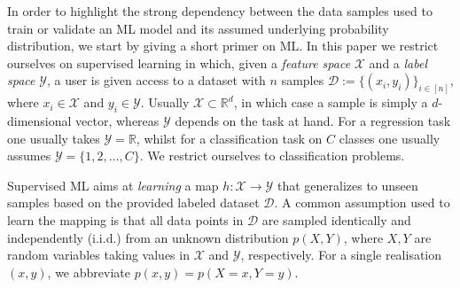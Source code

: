 \documentclass[11pt]{article}
\def \cD {\mathcal D}
\def \cX {\mathcal X}
\def \cY {\mathcal Y}
\newcommand{\RR}{\mathbb{R}}
\begin{document}
In order to highlight the strong dependency between the data samples used to train or validate an ML model and its assumed underlying probability distribution, we start by giving a short primer on ML. In this paper we restrict ourselves on supervised learning in which, given a \textit{feature space} $\cX$ and a \textit{label space} $\cY$, a user is given access to a dataset with $n$ samples  $\cD := \{(x_i, y_i)\}_{i \in [n]}$, where $x_i \in \cX$ and $y_i \in \cY$. Usually $\cX \subset \RR^d$, in which case a sample is simply a $d$-dimensional vector, whereas $\cY$ depends on the task at hand. For a regression task one usually takes $\cY = \RR$, whilst for a classification task on $C$ classes one usually assumes $\cY = \{1,2,\ldots,C\}$. We restrict ourselves to classification problems.

Supervised ML aims at \textit{learning} a map $h: \cX \rightarrow \cY$ that generalizes to unseen samples based on the provided labeled dataset $\cD$. 
A common assumption used to learn the mapping is that all data points in $\cD$ are sampled identically and independently (i.i.d.) from an unknown distribution $p(X,Y)$, where $X,Y$ are random variables taking values in $\cX$ and $\cY$, respectively. For a single realisation $(x, y)$, we abbreviate $p(x,y) = p(X\!=\!x,\!Y\!=\!y)$. 
\end{document}
